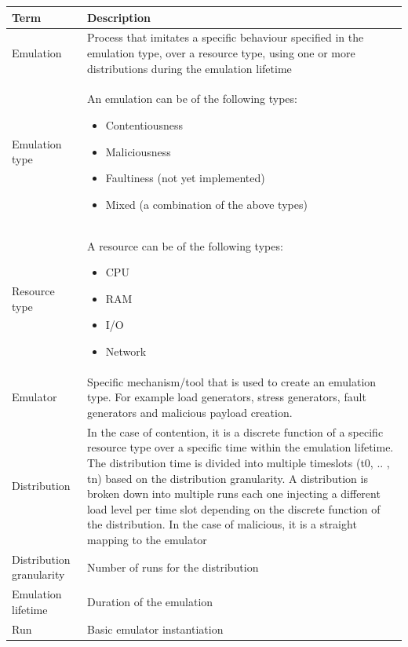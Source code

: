 \documentclass[letterpaper,10pt,english]{sphinxhowto}
\begin{document}
\begin{tabulary}{\linewidth}{|p{4.5cm}|p{8.5cm}|}
\hline
\textbf{\relax 
Term
} & \textbf{\relax 
Description
}\\\hline

Emulation
 & 
Process that imitates a specific behaviour specified in the emulation type, over a resource type, using one or more distributions during the emulation lifetime
\\\hline

Emulation type
 & 
An emulation can be of the following types:
\begin{itemize}
\item {} 
Contentiousness

\item {} 
Maliciousness

\item {} 
Faultiness (not yet implemented)

\item {} 
Mixed (a combination of the above types)

\end{itemize}
\\\hline

Resource type
 & 
A resource can be of the following types:
\begin{itemize}
\item {} 
CPU

\item {} 
RAM

\item {} 
I/O

\item {} 
Network

\end{itemize}
\\\hline

Emulator
 & 
Specific mechanism/tool that is used to create an emulation type. For example load generators, stress generators, fault generators and malicious payload creation.
\\\hline

Distribution
 & 
In the case of contention, it is a discrete function of a specific resource type over a specific time within the emulation lifetime. The distribution time is divided into multiple timeslots (t0, .. , tn) based on the distribution granularity. A distribution is broken down into multiple runs each one injecting a different load level per time slot depending on the discrete function of the distribution. In the case of malicious, it is a straight mapping to the emulator
\\\hline

Distribution granularity
 & 
Number of runs for the distribution
\\\hline

Emulation lifetime
 & 
Duration of the emulation
\\\hline

Run
 & 
Basic emulator instantiation
\\\hline
\end{tabulary}
\end{document}
